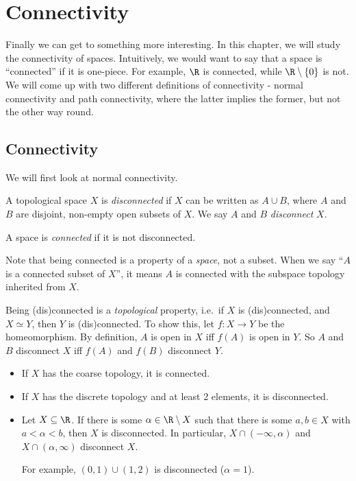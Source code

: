 \documentclass[a4paper]{article}
\begin{document}
\section{Connectivity}
Finally we can get to something more interesting. In this chapter, we will study the connectivity of spaces. Intuitively, we would want to say that a space is ``connected'' if it is one-piece. For example, $\R$ is connected, while $\R \setminus \{0\}$ is not. We will come up with two different definitions of connectivity - normal connectivity and path connectivity, where the latter implies the former, but not the other way round.

\subsection{Connectivity}
We will first look at normal connectivity.
\begin{defi}
  A topological space $X$ is \emph{disconnected} if $X$ can be written as $A\cup B$, where $A$ and $B$ are disjoint, non-empty open subsets of $X$. We say $A$ and $B$ \emph{disconnect} $X$.

  A space is \emph{connected} if it is not disconnected.
\end{defi}
Note that being connected is a property of a \emph{space}, not a subset. When we say ``$A$ is a connected subset of $X$'', it means $A$ is connected with the subspace topology inherited from $X$.

Being (dis)connected is a \emph{topological} property, i.e.\ if $X$ is (dis)connected, and $X\simeq Y$, then $Y$ is (dis)connected. To show this, let $f: X\to Y$ be the homeomorphism. By definition, $A$ is open in $X$ iff $f(A)$ is open in $Y$. So $A$ and $B$ disconnect $X$ iff $f(A)$ and $f(B)$ disconnect $Y$.

\begin{eg}\leavevmode
  \begin{itemize}
    \item If $X$ has the coarse topology, it is connected.
    \item If $X$ has the discrete topology and at least 2 elements, it is disconnected.
    \item Let $X\subseteq \R$. If there is some $\alpha \in \R\setminus X$ such that there is some $a, b\in X$ with $a < \alpha < b$, then $X$ is disconnected. In particular, $X\cap (-\infty, \alpha)$ and $X\cap (\alpha, \infty)$ disconnect $X$.

      For example, $(0, 1)\cup (1, 2)$ is disconnected ($\alpha = 1$).
  \end{itemize}
\end{eg}
\end{document}
